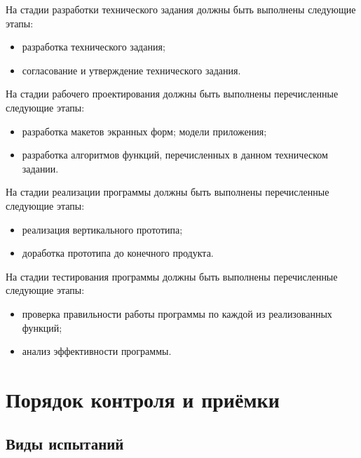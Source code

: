 \documentclass[utf8x]{article}
\begin{document}
\begin{flushleft}
\begin{itemize}
\end{itemize}

На стадии разработки технического задания должны быть выполнены следующие этапы:

\begin{itemize}

\item разработка технического задания;
\item согласование и утверждение технического задания. 

\end{itemize}

На стадии рабочего проектирования должны быть выполнены перечисленные следующие этапы:

\begin{itemize}

\item разработка макетов экранных форм;
 модели приложения; 
\item разработка алгоритмов функций, перечисленных в данном техническом задании.
\end{itemize}

На стадии реализации программы должны быть выполнены перечисленные следующие этапы:

\begin{itemize}

\item реализация вертикального прототипа;
\item доработка прототипа до конечного продукта. 

\end{itemize}

На стадии тестирования программы должны быть выполнены перечисленные следующие этапы:

\begin{itemize}

\item проверка правильности работы программы по каждой из реализованных функций;
\item анализ эффективности программы. 

\end{itemize}


\section{Порядок контроля и приёмки}
\subsection{Виды испытаний}


\end{flushleft}
\end{document}

